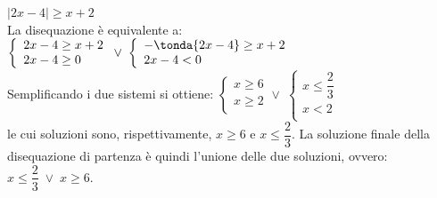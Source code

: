 \begin{esempio} \(|2x-4|\geq x+2\)\\[4pt] La disequazione è equivalente a:
\(\left\lbrace 
\begin{array}{l}
2x-4\geq x+2\\
2x-4\geq 0\\
\end{array}
\right.
\vee \;
\left\lbrace 
\begin{array}{l}
-\tonda{2x-4}\geq x+2\\
2x-4< 0\\
\end{array}
\right.\) \\[4pt]
Semplificando i due sistemi si ottiene:
\(\left\lbrace 
\begin{array}{l}
x\geq 6\\
x\geq 2\\
\end{array}
\right.
\vee \;
\left\lbrace 
\begin{array}{l}
x\leq \dfrac{2}{3}\\
x< 2\\
\end{array}
\right.\) \\[4pt]
le cui soluzioni sono, rispettivamente, \(x \geq 6\) e \(x\leq \dfrac{2}{3}\). La soluzione finale della disequazione di partenza
è quindi l'unione delle due soluzioni, ovvero: \(x\leq \dfrac{2}{3} \;\vee \;x \geq 6\).
\end{esempio}

